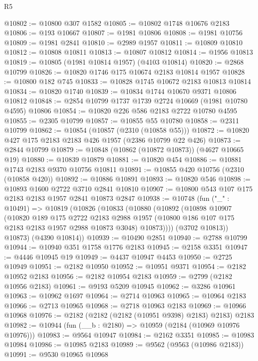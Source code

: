 \begin{lexlean}{R5}
\begin{coremodule}
@10802 := @10800 @307 @1582
@10805 := @10802 @1748 @10676 @2183
@10806 := @193 @10667
@10807 := @1981 @10806
@10808 := @1981 @10756
@10809 := @1981 @2841
@10810 := @2989 @1957
@10811 := @10809 @10810
@10812 := @10808 @10811
@10813 := @10807 @10812
@10814 := @1956 @10813
@10819 := @10805 (@1981 @10814 @1957) (@4103 @10814)
@10820 := @2868 @10799
@10826 := @10820 @1746 @175 @10674 @2183 @10814 @1957
@10828 := @10800 @182 @745
@10833 := @10828 @1745 @10672 @2183 @10813 @10814
@10834 := @10820 @1740
@10839 := @10834 @1744 @10670 @9371 @10806 @10812
@10848 := @2854 @10799 @1737 @1739 @2724 @10669 (@1981 @10780 @4595) @10806
@10854 := @10820 @226 @586 @2183 @2722 @10780 @4595
@10855 := @2305 @10799
@10857 := @10855 @55 @10780
@10858 := @2311 @10799
@10862 := @10854 (@10857 (@2310 (@10858 @55)))
@10872 := @10820 @427 @175 @2183 @2183 @426 @1957 (@2386 @10799 @22 @426)
@10873 := @2844 @10799
@10879 := @10848 (@10862 (@10872 @10873)) (@4627 @10665 @19)
@10880 := @10839 @10879
@10881 := @10820 @454
@10886 := @10881 @1743 @2183 @9370 @10756 @10811
@10891 := @10855 @420 @10756 (@2310 (@10858 @420))
@10892 := @10886 @10891
@10893 := @10820 @546
@10898 := @10893 @1600 @2722 @3710 @2841 @10810
@10907 := @10800 @543 @107 @175 @2183 @2183 @1957 @2841 @10873 @2847
@10938 := @10748
    (fun ("_" : @10491) =>
    @10819
      (@10826
        (@10833
          (@10880
            (@10892
              (@10898
                @10907
                (@10820
                  @189
                  @175
                  @2722
                  @2183
                  @2988
                  @1957
                  (@10800 @186 @107 @175 @2183 @2183 @1957 @2988 @10873 @3048)
                  @10873))))
          (@3702 @10813))
        @10873)
      (@4390 @10814))
@10939 := @10490 @2851
@10940 := @2788 @10799
@10944 := @10940 @351 @1758 @1776 @2183
@10945 := @2158 @3351
@10947 := @4446 @10945 @19
@10949 := @4437 @10947 @4453
@10950 := @2725 @10949
@10951 := @2182 @10950
@10952 := @10951 @9371
@10954 := @2182 @10952 @2183
@10956 := @2182 @10954 @2183
@10959 := @2799 (@2182 @10956 @2183)
@10961 := @9193 @5209 @10945
@10962 := @3286 @10961
@10963 := @10962 @1697
@10964 := @2714 @10963
@10965 := @10964 @2183
@10966 := @2713 @10965
@10968 := @2718 @10963 @2183
@10969 := @10966 @10968
@10976 := @2182 (@2182 (@2182 (@10951 @9398) @2183) @2183) @2183
@10982 := @10944 (fun (__b : @2180) => @10959 (@2184 (@10969 @10976 @10976)))
@10983 := @9564 @10947
@10984 := @2162 @3351
@10985 := @10983 @10984
@10986 := @10985 @2183
@10989 := @9562 (@9563 (@10986 @2183))
@10991 := @9530 @10965 @10968

\end{coremodule}
\end{lexlean}
